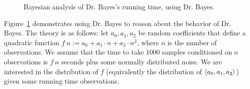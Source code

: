 \begin{figure}[p!]\centering%

\caption[Bayesian analysis of Dr. Bayes's running time, using Dr. Bayes]{Bayesian analysis of Dr. Bayes's running time, using Dr. Bayes.}%
\label{fig:quadratic-fit-bayesian}
\end{figure}

Figure~\ref{fig:quadratic-fit-bayesian} demonstrates using Dr. Bayes to reason about the behavior of Dr. Bayes.
The theory is as follows: let $a_0,a_1,a_2$ be random coefficients that define a quadratic function $f~n := a_0 + a_1 \cdot n + a_2 \cdot n^2$, where $n$ is the number of observations.
We assume that the time to take $1000$ samples conditioned on $n$ observations is $f~n$ seconds plus some normally distributed noise.
We are interested in the distribution of $f$ (equivalently the distribution of $\langle{a_0,a_1,a_2}\rangle$) given some running time observations.

